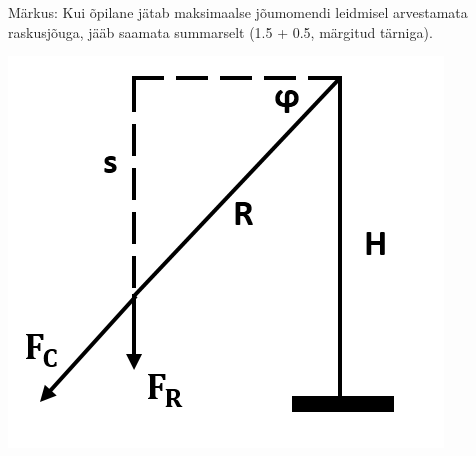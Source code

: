 Märkus: Kui õpilane jätab maksimaalse jõumomendi leidmisel arvestamata raskusjõuga, jääb saamata summarselt  (1.5 + 0.5, märgitud tärniga).
\begin{center}
\includegraphics[scale=0.5]{2019-v2g-09-sol.png}
\end{center}
\probend